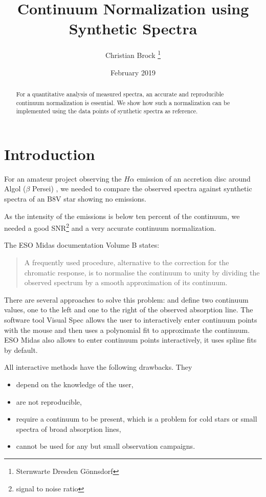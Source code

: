 \documentclass[10pt,a4paper,notitlepage,twocolumn]{article}
\title{Continuum Normalization using Synthetic Spectra}
\author{Christian Brock \footnote{Sternwarte Dresden Gönnsdorf}}
\date{February 2019}
\begin{document}
\setlength{\parindent}{0pt} 
\setlength{\parskip}{4pt} 

\maketitle

\begin{abstract}
	For a quantitative analysis of measured spectra, an accurate and reproducible continuum normalization is essential.
	We show how such a normalization can be implemented using the data points of synthetic spectra as reference.
\end{abstract}

\section{Introduction}

For an amateur project observing the $H\alpha$ emission of an accretion disc around Algol ($\beta$ Persei) \cite{Bitnar2017}, we needed to compare the observed spectra against synthetic spectra of an B8V star showing no emissions.

As the intensity of the emissions is below ten percent of the continuum, we needed a good SNR\footnote{signal to noise ratio} and a very accurate continuum normalization.

The ESO Midas documentation \cite{EsoMidas} Volume B states:
\begin{quote}
	A frequently used procedure, alternative to the correction for the chromatic response, is to normalise the continuum to unity by dividing the observed spectrum by a smooth approximation of its continuum.
\end{quote}

There are several approaches to solve this problem:
\cite{Richards1993} and \cite{Liebisch2018} define two continuum values, one to the left and one to the right of the observed absorption line.
The software tool Visual Spec \cite{DesnouxVSpecTutorial} allows the user to interactively enter continuum points with the mouse and then uses a polynomial fit to approximate the continuum.
ESO Midas \cite{EsoMidas} also allows to enter continuum points interactively, it uses spline fits by default.

All interactive methods have the following drawbacks. They
\begin{itemize}
	\item depend on the knowledge of the user,
	\item are not reproducible,
	\item require a continuum to be present, which is a problem for cold stars or small spectra of broad absorption lines,
	\item cannot be used for any but small observation campaigns.
\end{itemize}
\end{document}

